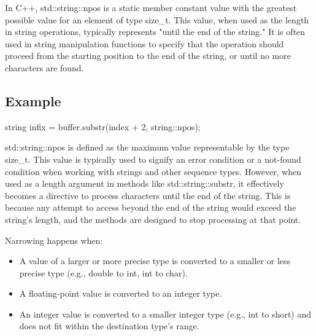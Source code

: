 \documentclass{report}
\begin{document}
    \pagebreak 
    \bigbreak \noindent 
    \begin{concept}
        In C++, std::string::npos is a static member constant value with the greatest possible value for an element of type size\_t. This value, when used as the length in string operations, typically represents "until the end of the string." It is often used in string manipulation functions to specify that the operation should proceed from the starting position to the end of the string, or until no more characters are found.
    \end{concept}
    \bigbreak \noindent 
    \subsection{Example}
    \bigbreak \noindent 
    \begin{cppcode}
    string infix = buffer.substr(index + 2, string::npos);
    \end{cppcode}
    \bigbreak \noindent 
    std::string::npos is defined as the maximum value representable by the type size\_t. This value is typically used to signify an error condition or a not-found condition when working with strings and other sequence types. However, when used as a length argument in methods like std::string::substr, it effectively becomes a directive to process characters until the end of the string. This is because any attempt to access beyond the end of the string would exceed the string's length, and the methods are designed to stop processing at that point.

    \pagebreak 
    \bigbreak \noindent 
    Narrowing happens when:
    \begin{itemize}
        \item A value of a larger or more precise type is converted to a smaller or less precise type (e.g., double to int, int to char).
        \item A floating-point value is converted to an integer type.
        \item An integer value is converted to a smaller integer type (e.g., int to short) and does not fit within the destination type's range.
    \end{itemize}
\end{document}
